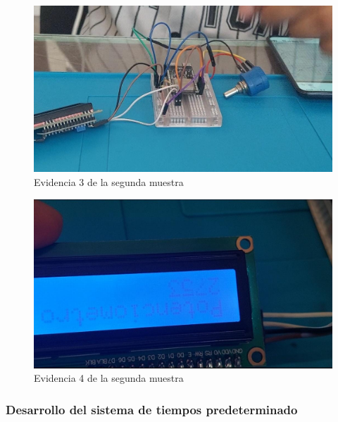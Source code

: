 \begin{figure}[H]
        \centering
        \includegraphics[trim = {0mm 0mm 0mm 0mm},clip,scale=0.2]{10/Img/muestra2Prueba3.jpg}
        \caption{Evidencia 3 de la segunda muestra}
        \label{muestra2Prueba3}
    \end{figure}

\begin{figure}[H]
        \centering
        \includegraphics[trim = {0mm 0mm 0mm 0mm},clip,scale=0.2]{10/Img/muestra2Prueba4.jpg}
        \caption{Evidencia 4 de la segunda muestra}
        \label{muestra2Prueba4}
    \end{figure}
%
%
\subsubsection{Desarrollo del sistema de tiempos predeterminado}


